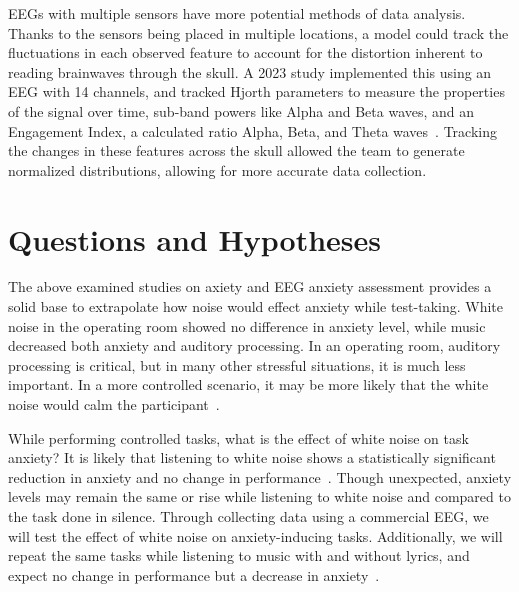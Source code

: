 \documentclass[journal]{IEEEtran}
\begin{document}
EEGs with multiple sensors have more potential methods of data analysis. Thanks to the sensors being placed in multiple locations, a model could track the fluctuations in each observed feature to account for the distortion inherent to reading brainwaves through the skull. A 2023 study implemented this using an EEG with 14 channels, and tracked Hjorth parameters to measure the properties of the signal over time, sub-band powers like Alpha and Beta waves, and an Engagement Index, a calculated ratio Alpha, Beta, and Theta waves~\cite{chatterjeeDetectionMentalStress2023}. Tracking the changes in these features across the skull allowed the team to generate normalized distributions, allowing for more accurate data collection.



\section{Questions and Hypotheses}

The above examined studies on axiety and EEG anxiety assessment provides a solid base to extrapolate how noise would effect anxiety while test-taking. White noise in the operating room showed no difference in anxiety level, while music decreased both anxiety and auditory processing\cite{shahrokhiEffectWhiteNoise2022,wayEffectNoiseAuditory2013}. In an operating room, auditory processing is critical, but in many other stressful situations, it is much less important. In a more controlled scenario, it may be more likely that the white noise would calm the participant~\cite{zhangSedativeEffectWhite2025}.

While performing controlled tasks, what is the effect of white noise on task anxiety? It is likely that listening to white noise shows a statistically significant reduction in anxiety and no change in performance~\cite{zhangSedativeEffectWhite2025}. Though unexpected, anxiety levels may remain the same or rise while listening to white noise and compared to the task done in silence\cite{shahrokhiEffectWhiteNoise2022,marzollaImpactNoiseExposure2024}. Through collecting data using a commercial EEG, we will test the effect of white noise on anxiety-inducing tasks. Additionally, we will repeat the same tasks while listening to music with and without lyrics, and expect no change in performance but a decrease in anxiety~\cite{kissEffectPreferredBackground2021}.
\end{document}

